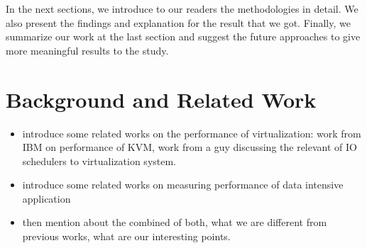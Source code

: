 \documentclass{acmsig}
\begin{document}
In the next sections, we introduce to our readers the methodologies in detail. We also present the findings and explanation for the result that we got. Finally, we summarize our work at the last section and suggest the future approaches to give more meaningful results to the study.




\section{Background and Related Work}
\begin{itemize}
  \item introduce some related works on the performance of virtualization: work from IBM on performance of KVM, work from a guy discussing the relevant of IO schedulers to virtualization system.
  \item introduce some related works on measuring performance of data intensive application
 \item then mention about the combined of both, what we are different from previous works, what are our interesting points.
\end{itemize}
\end{document}
